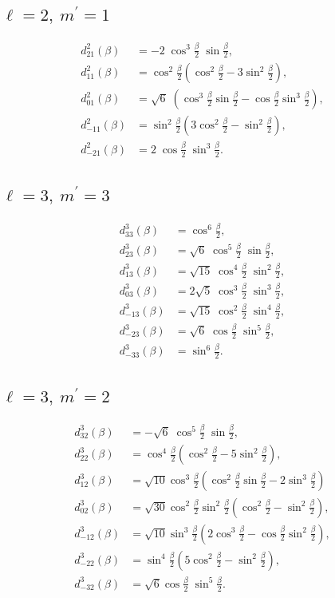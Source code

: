 \documentclass[%
aps,
prd,
amssymb,
amsmath,
amsfonts,
eqsecnum,
showpacs,
nofootinbib,
floatfix,
twocolumn,
twoside,
a4paper,
superscriptaddress
]{revtex4-1}
\newcommand{\botwo}{\frac{\beta}{2}}
\begin{document}
\subsection{\texorpdfstring{$\ell = 2, \:m^{\prime} = 1$}{l=2,m'=1}}
\begin{align*}
    d^2_{21} (\beta) &= -2 \; \cos^3 \botwo \; \sin \botwo, \\
    d^2_{11} (\beta) &= \cos^2 \botwo \left( \cos^2 \botwo - 3 \sin^2 \botwo \right), \\
    d^2_{01} (\beta) &= \sqrt{6} \; \left( \cos^3 \botwo \sin \botwo - \cos \botwo \sin^3 \botwo \right), \\
    d^2_{-11} (\beta) &= \sin^2 \botwo \left( 3 \cos^2 \botwo - \sin^2 \botwo \right), \\
    d^2_{-21} (\beta) &= 2 \; \cos \botwo \; \sin^3 \botwo.
\end{align*}

\subsection{\texorpdfstring{$\ell = 3,  \:m^{\prime} = 3$}{l=3,m'=3}}
\begin{align*}
    d^3_{33} (\beta) &= \cos^6 \botwo, \\
    d^3_{23} (\beta) &= \sqrt{6} \;  \cos^5 \botwo \; \sin \botwo, \\
    d^3_{13} (\beta) &= \sqrt{15} \;  \cos^4 \botwo \; \sin^2 \botwo, \\
    d^3_{03} (\beta) &= 2 \sqrt{5} \;  \cos^3 \botwo \; \sin^3 \botwo, \\
    d^3_{-13} (\beta) &= \sqrt{15} \;  \cos^2 \botwo \; \sin^4 \botwo, \\
    d^3_{-23} (\beta) &= \sqrt{6} \;  \cos \botwo \; \sin^5 \botwo, \\
    d^3_{-33} (\beta) &= \sin^6 \botwo.
\end{align*}

\subsection{\texorpdfstring{$\ell = 3, \:m^{\prime} = 2$}{l=3,m'=2}}
\begin{align*}
    d^3_{32} (\beta) &= -\sqrt{6}\;  \cos^5 \botwo \; \sin \botwo, \\
    d^3_{22} (\beta) &= \cos^4 \botwo \left( \cos^2 \botwo - 5 \sin^2 \botwo \right), \\
    d^3_{12} (\beta) &= \sqrt{10} \cos^3 \botwo \left( \cos^2 \botwo \sin \botwo - 2 \sin^3 \botwo \right) \\
    d^3_{02} (\beta) &= \sqrt{30} \cos^2 \botwo \sin^2 \botwo \left( \cos^2 \botwo - \sin^2 \botwo  \right), \\
    d^3_{-12} (\beta) &= \sqrt{10} \sin^3 \botwo \left( 2 \cos^3 \botwo - \cos \botwo \sin^2 \botwo  \right), \\
    d^3_{-22} (\beta) &= \sin^4 \botwo \left( 5 \cos^2 \botwo - \sin^2 \botwo \right), \\
    d^3_{-32} (\beta) &= \sqrt{6} \cos \botwo \; \sin^5 \botwo.
\end{align*}
\end{document}
